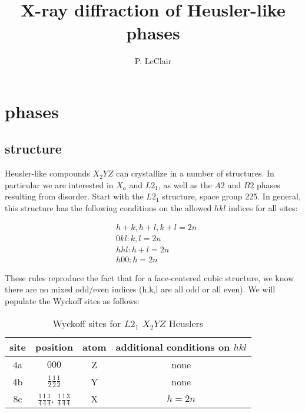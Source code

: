 \documentclass[aps,amsmath,amssymb,prb,superscriptaddress,longtable,preprint,fleqn]{revtex4}
\begin{document}
\renewcommand{\theenumi}{\Roman{enumi}}%
\renewcommand{\theenumi}{(\roman{enumi})}%

\setlength{\tabcolsep}{0.5em}

\title{X-ray diffraction of Heusler-like phases}


\author{P. LeClair}



\maketitle
\tableofcontents
\clearpage 

\section{ phases}

\subsection{ structure}

Heusler-like compounds $X_2YZ$ can crystallize in a number of structures. In particular we are interested in $X_a$ and $L2_1$, as well as the $A2$ and $B2$ phases resulting from disorder. Start with the $L2_1$ structure, space group 225.\cite{itc} In general, this structure has the following conditions on the allowed $hkl$ indices for all sites:

\begin{align*}
 &h+k, h+l, k+l=2n\\
 &0kl: k,l=2n\\
 &hhl: h+l=2n\\
 &h00: h=2n
\end{align*}

These rules reproduce the fact that for a face-centered cubic structure, we know there are no mixed odd/even indices (h,k,l are all odd or all even). We will populate the Wyckoff sites as follows:

\begin{table}[htdp]
\begin{center}
\caption{Wyckoff sites for $L2_1$ $X_2YZ$ Heuslers}
\begin{tabular}{cccc}
site & position & atom & additional conditions on $hkl$\\
\hline
4a & $000$ & Z & none\\
4b & $\frac{1}{2}\frac{1}{2}\frac{1}{2}$ & Y & none \\
8c & $\frac{1}{4}\frac{1}{4}\frac{1}{4}$, $\frac{1}{4}\frac{1}{4}\frac{3}{4}$ & X & $h=2n$\\
\end{tabular}
\end{center}
\label{wycoff.l21}
\end{table}%
\end{document}
